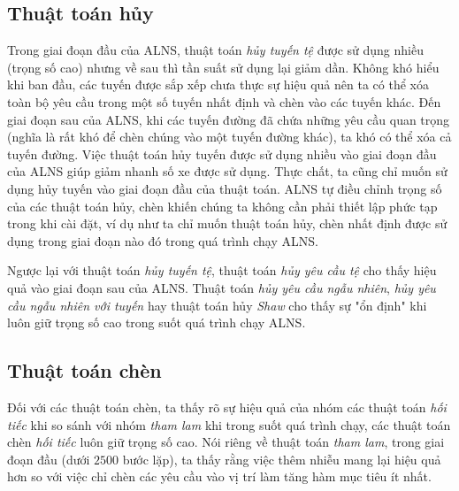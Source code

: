 \subsection*{Thuật toán hủy}
Trong giai đoạn đầu của ALNS, thuật toán \textit{hủy tuyến tệ} được sử dụng nhiều (trọng số cao) nhưng về sau thì tần suất sử dụng lại giảm dần. Không khó hiểu khi ban đầu, các tuyến được sắp xếp chưa thực sự hiệu quả nên ta có thể xóa toàn bộ yêu cầu trong một số tuyến nhất định và chèn vào các tuyến khác. Đến giai đoạn sau của ALNS, khi các tuyến đường đã chứa những yêu cầu quan trọng (nghĩa là rất khó để chèn chúng vào một tuyến đường khác), ta khó có thể xóa cả tuyến đường. Việc thuật toán hủy tuyến được sử dụng nhiều vào giai đoạn đầu của ALNS giúp giảm nhanh số xe được sử dụng. Thực chất, ta cũng chỉ muốn sử dụng hủy tuyến vào giai đoạn đầu của thuật toán. ALNS tự điều chỉnh trọng số của các thuật toán hủy, chèn khiến chúng ta không cần phải thiết lập phức tạp trong khi cài đặt, ví dụ như ta chỉ muốn thuật toán hủy, chèn nhất định được sử dụng trong giai đoạn nào đó trong quá trình chạy ALNS. 

Ngược lại với thuật toán \textit{hủy tuyến tệ}, thuật toán \textit{hủy yêu cầu tệ} cho thấy hiệu quả vào giai đoạn sau của ALNS. Thuật toán \textit{hủy yêu cầu ngẫu nhiên}, \textit{hủy yêu cầu ngẫu nhiên với tuyến} hay thuật toán hủy \textit{Shaw} cho thấy sự "ổn định" khi luôn giữ trọng số cao trong suốt quá trình chạy ALNS.

\subsection*{Thuật toán chèn}
Đối với các thuật toán chèn, ta thấy rõ sự hiệu quả của nhóm các thuật toán \textit{hối tiếc} khi so sánh với nhóm \textit{tham lam} khi trong suốt quá trình chạy, các thuật toán chèn \textit{hối tiếc} luôn giữ trọng số cao. Nói riêng về thuật toán \textit{tham lam}, trong giai đoạn đầu (dưới $2500$ bước lặp), ta thấy rằng việc thêm nhiễu mang lại hiệu quả hơn so với việc chỉ chèn các yêu cầu vào vị trí làm tăng hàm mục tiêu ít nhất. 
